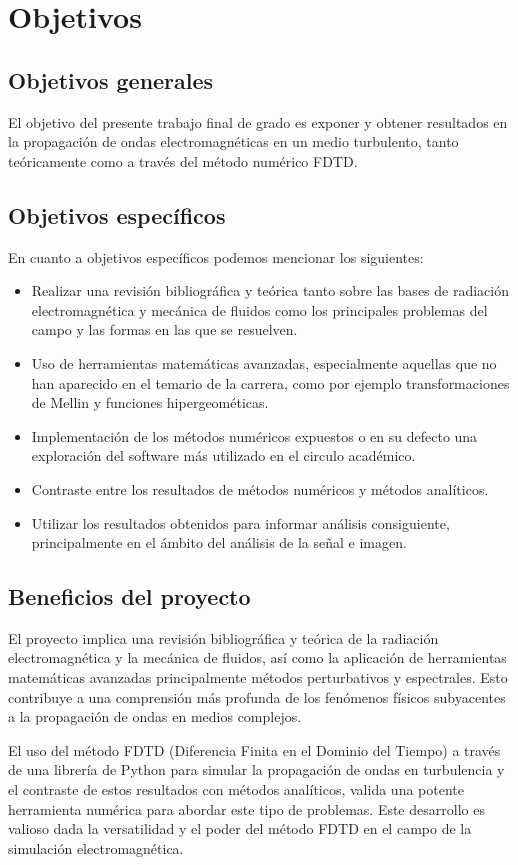 \section{Objetivos}

\subsection{Objetivos generales}

El objetivo del presente trabajo final de grado es exponer y obtener resultados en la propagación de ondas electromagnéticas en un medio turbulento, tanto teóricamente como a través del método numérico FDTD. 

\subsection{Objetivos específicos}

En cuanto a objetivos específicos podemos mencionar los siguientes:

\begin{itemize}
    \item Realizar una revisión bibliográfica y teórica tanto sobre las bases de radiación electromagnética y mecánica de fluidos como los principales problemas del campo y las formas en las que se resuelven. 
    \item Uso de herramientas matemáticas avanzadas, especialmente aquellas que no han aparecido en el temario de la carrera, como por ejemplo transformaciones de Mellin y funciones hipergeométicas.
    \item Implementación de los métodos numéricos expuestos o en su defecto una exploración del software más utilizado en el circulo académico.
    \item Contraste entre los resultados de métodos numéricos y métodos analíticos. 
    \item Utilizar los resultados obtenidos para informar análisis consiguiente, principalmente en el ámbito del análisis de la señal e imagen. 
\end{itemize}

\subsection{Beneficios del proyecto}

El proyecto implica una revisión bibliográfica y teórica de la radiación electromagnética y la mecánica de fluidos, así como la aplicación de herramientas matemáticas avanzadas principalmente métodos perturbativos y espectrales. Esto contribuye a una comprensión más profunda de los fenómenos físicos subyacentes a la propagación de ondas en medios complejos.

El uso del método FDTD (Diferencia Finita en el Dominio del Tiempo) a través de una librería de Python para simular la propagación de ondas en turbulencia y el contraste de estos resultados con métodos analíticos, valida una potente herramienta numérica para abordar este tipo de problemas. Este desarrollo es valioso dada la versatilidad y el poder del método FDTD en el campo de la simulación electromagnética.